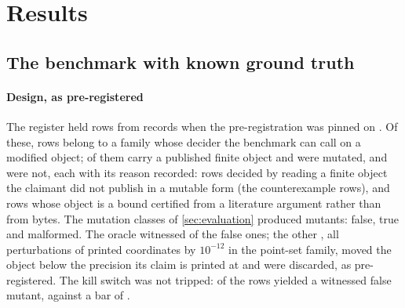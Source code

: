 \documentclass[preprint,11pt,a4paper]{elsarticle}
\theoremstyle{definition}
\begin{document}
\section{Results}\label{sec:results}

\subsection{The benchmark with known ground truth}\label{sec:selfaudit}

\paragraph{Design, as pre-registered}
The register held \MtSaRows{} rows from \MtSaRecords{} records when the pre-registration was pinned on \MtSaRunDate. Of these, \MtSaMutRows{} rows belong to a family whose decider the benchmark can call on a modified object; \MtSaMutObjects{} of them carry a published finite object and were mutated, and \MtSaMutNotMutated{} were not, each with its reason recorded: rows decided by reading a finite object the claimant did not publish in a mutable form (the counterexample rows), and rows whose object is a bound certified from a literature argument rather than from bytes. The mutation classes of \cref{sec:evaluation} produced \MtSaMutants{} mutants: \MtSaFalse{} false, \MtSaTrue{} true and \MtSaMalformed{} malformed. The oracle witnessed \MtSaFalseWitnessed{} of the false ones; the other \MtSaDiscards, all perturbations of printed coordinates by $10^{-12}$ in the point-set family, moved the object below the precision its claim is printed at and were discarded, as pre-registered. The kill switch was not tripped: \MtSaWitnessedRows{} of the \MtSaMutRows{} rows yielded a witnessed false mutant, against a bar of \MtSaKillBar.
\end{document}
